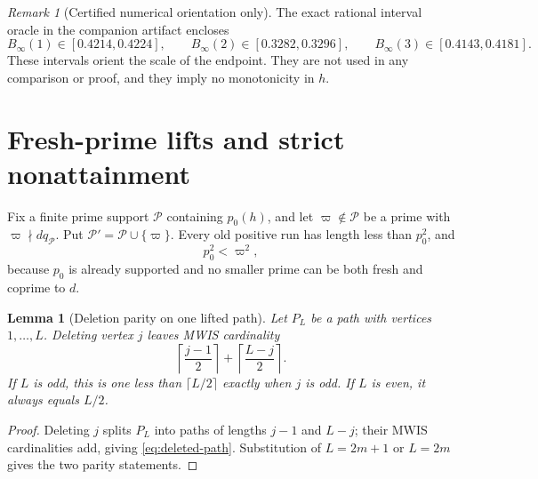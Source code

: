 \documentclass[11pt]{article}
\newtheorem{lemma}[theorem]{Lemma}
\theoremstyle{definition}
\theoremstyle{remark}
\newtheorem{remark}[theorem]{Remark}
\begin{document}
\begin{remark}[Certified numerical orientation only]
The exact rational interval oracle in the companion artifact encloses
\[
 B_\infty(1)\in[0.4214,0.4224],\qquad
 B_\infty(2)\in[0.3282,0.3296],\qquad
 B_\infty(3)\in[0.4143,0.4181].
\]
These intervals orient the scale of the endpoint.  They are not used in
any comparison or proof, and they imply no monotonicity in \(h\).
\end{remark}

\section{Fresh-prime lifts and strict nonattainment}

Fix a finite prime support \(\mathcal P\) containing \(p_0(h)\), and let
\(\varpi\notin\mathcal P\) be a prime with
\(\varpi\nmid d q_{\mathcal P}\).  Put
\(\mathcal P'=\mathcal P\cup\{\varpi\}\).  Every old positive run has
length less than \(p_0^2\), and
\[
 p_0^2<\varpi^2,
\]
because \(p_0\) is already supported and no smaller prime can be both
fresh and coprime to \(d\).

\begin{lemma}[Deletion parity on one lifted path]
\label{lem:path-deletion}
Let \(P_L\) be a path with vertices \(1,\ldots,L\).  Deleting vertex
\(j\) leaves MWIS cardinality
\begin{equation}
 \left\lceil\frac{j-1}{2}\right\rceil
 +\left\lceil\frac{L-j}{2}\right\rceil.
 \label{eq:deleted-path}
\end{equation}
If \(L\) is odd, this is one less than
\(\lceil L/2\rceil\) exactly when \(j\) is odd.  If \(L\) is even, it
always equals \(L/2\).
\end{lemma}

\begin{proof}
Deleting \(j\) splits \(P_L\) into paths of lengths \(j-1\) and \(L-j\);
their MWIS cardinalities add, giving \eqref{eq:deleted-path}.  Substitution
of \(L=2m+1\) or \(L=2m\) gives the two parity statements.
\end{proof}
\end{document}
